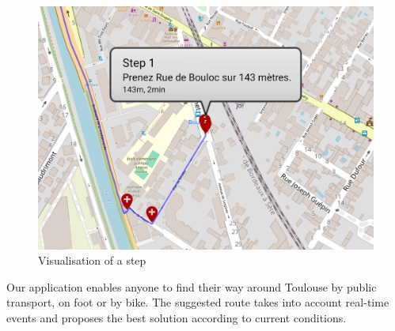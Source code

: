 \begin{figure}[h]
    \centering
    \includegraphics[scale=0.2]{img/step_cut.png}
    \caption{Visualisation of a step}
    \label{fig:StepVisualisation}
\end{figure}


Our application enables anyone to find their way around Toulouse by public transport, on foot or by bike. The suggested route takes into account real-time events and proposes the best solution according to current conditions.
